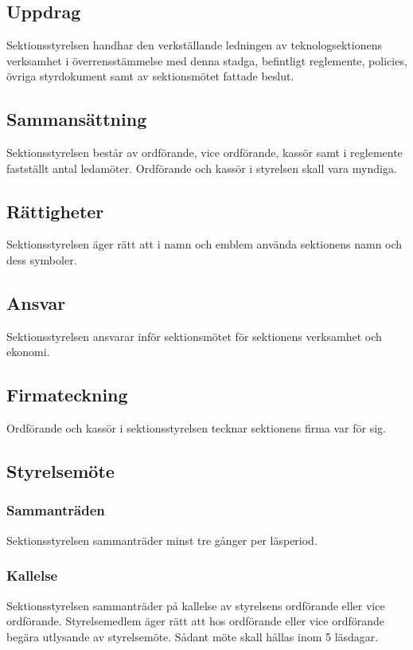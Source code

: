\section{\STYRITFULL}

\subsection{Uppdrag}
Sektionsstyrelsen handhar den verkställande ledningen av teknologsektionens verksamhet i överrensstämmelse med denna stadga, befintligt reglemente, policies, övriga styrdokument samt av sektionsmötet fattade beslut.

\subsection{Sammansättning}
Sektionsstyrelsen består av ordförande, vice ordförande, kassör samt i reglemente fastställt antal ledamöter. Ordförande och kassör i styrelsen skall vara myndiga.

\subsection{Rättigheter}
Sektionsstyrelsen äger rätt att i namn och emblem använda sektionens namn och dess symboler.

\subsection{Ansvar}
Sektionsstyrelsen ansvarar inför sektionsmötet för sektionens verksamhet och ekonomi.

\subsection{Firmateckning}
Ordförande och kassör i sektionsstyrelsen tecknar sektionens firma var för sig.

\subsection{Styrelsemöte}

\subsubsection{Sammanträden}
Sektionsstyrelsen sammanträder minst tre gånger per läsperiod.

\subsubsection{Kallelse}
Sektionsstyrelsen sammanträder på kallelse av styrelsens ordförande eller vice ordförande. Styrelsemedlem äger rätt att hos ordförande eller vice ordförande begära utlysande av styrelsemöte. Sådant möte skall hållas inom 5 läsdagar.

